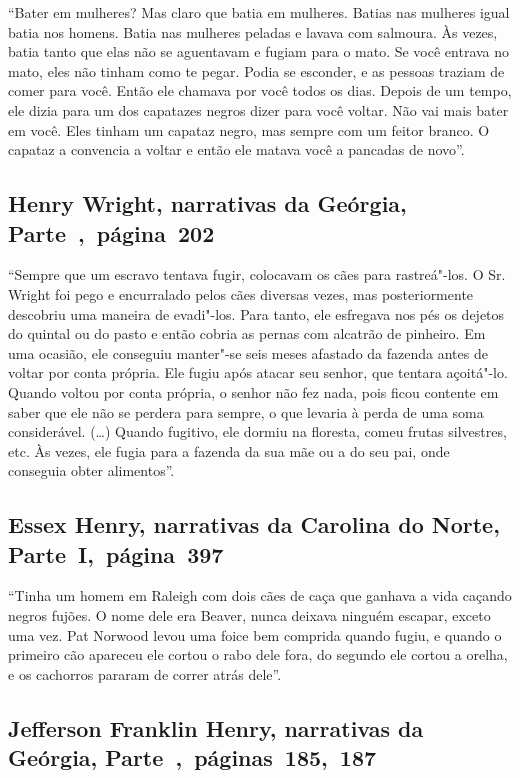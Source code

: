 ``Bater em mulheres? Mas claro que batia em mulheres. Batias nas %
mulheres igual batia nos homens. Batia nas mulheres peladas e lavava com
salmoura. Às vezes, batia tanto que elas não se aguentavam e fugiam para
o mato. Se você entrava no mato, eles não tinham como te pegar. Podia
se esconder, e as pessoas traziam de comer para você. Então ele chamava
por você todos os dias. Depois de um tempo, ele dizia para um dos
capatazes negros dizer para você voltar. Não vai mais bater em você.
Eles tinham um capataz negro, mas sempre com um feitor branco. O capataz
a convencia a voltar e então ele matava você a pancadas de novo''.

\subsection{Henry Wright, narrativas da Geórgia, Parte~,~página~202}
\label{ref321}

``Sempre que um escravo tentava fugir, colocavam os cães para
rastreá"-los. O Sr. Wright foi pego e encurralado pelos cães diversas
vezes, mas posteriormente descobriu uma maneira de evadi"-los. Para
tanto, ele esfregava nos pés os dejetos do quintal ou do pasto e então
cobria as pernas com alcatrão de pinheiro. Em uma ocasião, ele conseguiu
manter"-se seis meses afastado da fazenda antes de voltar por conta
própria. Ele fugiu após atacar seu senhor, que tentara açoitá"-lo. Quando
voltou por conta própria, o senhor não fez nada, pois ficou contente em
saber que ele não se perdera para sempre, o que levaria à perda de uma
soma considerável. (\ldots{}) Quando fugitivo, ele dormiu na floresta,
comeu frutas silvestres, etc. Às vezes, ele fugia para a fazenda da sua
mãe ou a do seu pai, onde conseguia obter alimentos''.

\subsection{Essex Henry, narrativas da Carolina do Norte, Parte~I,~página~397}
\label{ref138}

``Tinha um homem em Raleigh com dois cães de caça que ganhava a vida
caçando negros fujões. O nome dele era Beaver, nunca deixava ninguém
escapar, exceto uma vez. Pat Norwood levou uma foice bem comprida quando
fugiu, e quando o primeiro cão apareceu ele cortou o rabo dele fora, do
segundo ele cortou a orelha, e os cachorros pararam de correr atrás
dele''.

\subsection{Jefferson Franklin Henry, narrativas da Geórgia, Parte~,~páginas~185,~187}
\label{ref140}


